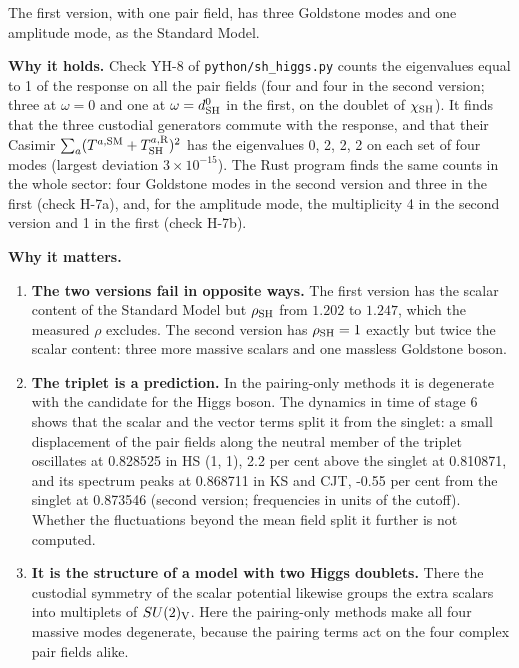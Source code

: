 \documentclass[
  10pt,
]{article}
\providecommand{\tightlist}{%
  \setlength{\itemsep}{0pt}\setlength{\parskip}{0pt}}
\begin{document}
The first version, with one pair field, has three Goldstone modes and
one amplitude mode, as the Standard Model.

\textbf{Why it holds.} Check YH-8 of \texttt{python/sh\_higgs.py} counts
the eigenvalues equal to 1 of the response on all the pair fields (four
and four in the second version; three at \(\omega=0\) and one at
\(\omega=d^0_{\rm SH}\) in the first, on the doublet of
\(\chi_{\rm SH}\)). It finds that the three custodial generators commute
with the response, and that their Casimir
\(\sum_a(T^{a,{\rm SM}}+T^{a,{\rm R}}_{\rm SH})^2\) has the eigenvalues
0, 2, 2, 2 on each set of four modes (largest deviation
\(3\times10^{-15}\)). The Rust program finds the same counts in the
whole sector: four Goldstone modes in the second version and three in
the first (check H-7a), and, for the amplitude mode, the multiplicity 4
in the second version and 1 in the first (check H-7b).

\textbf{Why it matters.}

\begin{enumerate}
\def\labelenumi{\arabic{enumi}.}
\tightlist
\item
  \textbf{The two versions fail in opposite ways.} The first version has
  the scalar content of the Standard Model but \(\rho_{\rm SH}\) from
  \(1.202\) to \(1.247\), which the measured \(\rho\) excludes. The
  second version has \(\rho_{\rm SH}=1\) exactly but twice the scalar
  content: three more massive scalars and one massless Goldstone boson.
\item
  \textbf{The triplet is a prediction.} In the pairing-only methods it
  is degenerate with the candidate for the Higgs boson. The dynamics in
  time of stage 6 shows that the scalar and the vector terms split it
  from the singlet: a small displacement of the pair fields along the
  neutral member of the triplet oscillates at 0.828525 in HS (1, 1), 2.2
  per cent above the singlet at 0.810871, and its spectrum peaks at
  0.868711 in KS and CJT, -0.55 per cent from the singlet at 0.873546
  (second version; frequencies in units of the cutoff). Whether the
  fluctuations beyond the mean field split it further is not computed.
\item
  \textbf{It is the structure of a model with two Higgs doublets.} There
  the custodial symmetry of the scalar potential likewise groups the
  extra scalars into multiplets of \(SU(2)_{\rm V}\). Here the
  pairing-only methods make all four massive modes degenerate, because
  the pairing terms act on the four complex pair fields alike.
\end{enumerate}
\end{document}
